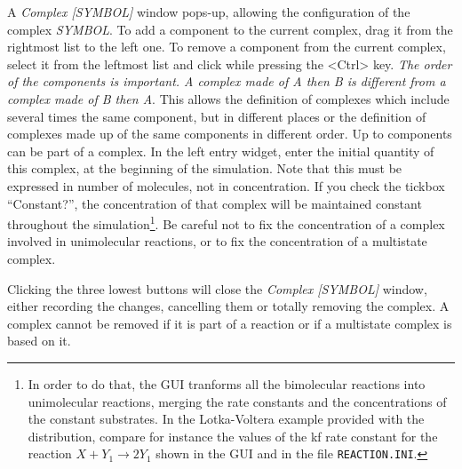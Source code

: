  A \emph{Complex [SYMBOL]}
window pops-up, allowing the configuration of the complex \emph{SYMBOL}. To add
a component to the current complex, drag it from the rightmost list to the left
one. To remove a component from the current complex, select it from the leftmost
list and click while pressing the <Ctrl> key. \emph{The order of the components
  is important. A complex made of A then B is different from a complex made of B
  then A}. This allows the definition of complexes which include several times
the same component, but in different places or the definition of complexes made
up of the same components in different order. Up to \MAXCOMPONENTSINCOMPLEX{}
components can be part of a complex.  In the left entry widget, enter the
initial quantity of this complex, at the beginning of the simulation.  Note that
this must be expressed in number of molecules, not in concentration. If you
check the tickbox ``Constant?'', the concentration of that complex will be
maintained constant throughout the simulation\footnote{In order to do that, the
  GUI tranforms all the bimolecular reactions into unimolecular reactions,
  merging the rate constants and the concentrations of the constant substrates.
  In the Lotka-Voltera example provided with the distribution, compare for
  instance the values of the kf rate constant for the reaction
  $X+Y_1\rightarrow2Y_1$ shown in the GUI and in the file
  \texttt{REACTION.INI}.}. Be careful not to fix the concentration of a complex
involved in unimolecular reactions, or to fix the concentration of a multistate
complex.

Clicking the three lowest buttons will close the \emph{Complex [SYMBOL]}
window, either recording the changes, cancelling them or totally removing the
complex. A complex cannot be removed if it is part of a reaction or if a
multistate complex is based on it.

